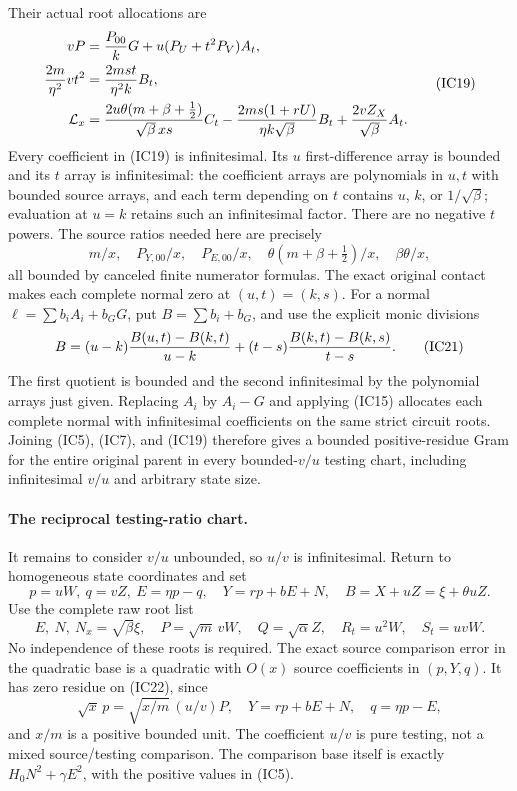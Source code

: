 Their actual root allocations are
\[
\begin{aligned}
 vP&={P_{00}\over k}G+u(P_U+t^2P_V)A_t,\\
 {2m\over\eta^2}vt^2&={2ms t\over\eta^2k}B_t,\\
 \mathcal L_x&={2u\theta(m+\beta+\tfrac12)
                    \over\sqrt\beta\,xs}C_t
 -{2ms(1+rU)\over\eta k\sqrt\beta}B_t
 +{2vZ_X\over\sqrt\beta}A_t.                          \end{aligned} \tag{IC19}
\]
Every coefficient in (IC19) is infinitesimal. Its $u$ first-difference
array is bounded and its $t$ array is infinitesimal: the coefficient
arrays are polynomials in $u,t$ with bounded source arrays, and each
term depending on $t$ contains $u$, $k$, or $1/\sqrt\beta$; evaluation
at $u=k$ retains such an infinitesimal factor. There are no negative
$t$ powers. The source ratios needed here are precisely
\[
 m/x,\quad P_{Y,00}/x,\quad P_{E,00}/x,\quad
 \theta(m+\beta+\tfrac12)/x,\quad \beta\theta/x,
                                                               \tag{IC20}
\]
all bounded by canceled finite numerator formulas.
The exact original contact makes each complete normal zero at
$(u,t)=(k,s)$. For a normal $\ell=\sum b_iA_i+b_GG$, put
$B=\sum b_i+b_G$, and use the explicit monic divisions
\[
 B=(u-k){B(u,t)-B(k,t)\over u-k}
       +(t-s){B(k,t)-B(k,s)\over t-s}.                 \tag{IC21}
\]
The first quotient is bounded and the second infinitesimal by the
polynomial arrays just given. Replacing $A_i$ by $A_i-G$ and applying
(IC15) allocates each complete normal with infinitesimal coefficients
on the same strict circuit roots. Joining (IC5), (IC7), and (IC19)
therefore gives a bounded positive-residue Gram for the entire original
parent in every bounded-$v/u$ testing chart, including infinitesimal
$v/u$ and arbitrary state size.

\paragraph{The reciprocal testing-ratio chart.}
It remains to consider $v/u$ unbounded, so $u/v$ is infinitesimal.
Return to homogeneous state coordinates and set
\[
 p=uW,\ q=vZ,\ E=\eta p-q,\quad
 Y=rp+bE+N,\quad B=X+uZ=\xi+\theta uZ.
\]
Use the complete raw root list
\[
 E,\ N,\ N_x=\sqrt\beta\xi,\quad
 P=\sqrt m\,vW,\quad Q=\sqrt\alpha Z,\quad
 R_t=u^2W,\quad S_t=uvW.                              \tag{IC22}
\]
No independence of these roots is required.
The exact source comparison error in the quadratic base is a
quadratic with $O(x)$ source coefficients in $(p,Y,q)$. It has zero
residue on (IC22), since
\[
 \sqrt x\,p=\sqrt{x/m}\,(u/v)P,\quad
 Y=rp+bE+N,\quad q=\eta p-E,                          \tag{IC23}
\]
and $x/m$ is a positive bounded unit. The coefficient $u/v$ is
pure testing, not a mixed source/testing comparison. The comparison
base itself is exactly $H_0N^2+\gamma E^2$, with the positive values
in (IC5).

